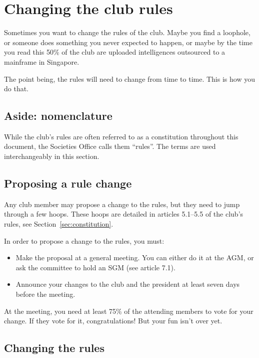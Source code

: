 \section{Changing the club rules}
\label{sec:rulechanges}

Sometimes you want to change the rules of the club. Maybe you find a loophole, or someone does something you never expected to happen, or maybe by the time you read this 50\% of the club are uploaded intelligences outsourced to a mainframe in Singapore.

The point being, the rules will need to change from time to time. This is how you do that.

\subsection{Aside: nomenclature}

While the club's rules are often referred to as a constitution throughout this document, the Societies Office calls them ``rules''. The terms are used interchangeably in this section.

\subsection{Proposing a rule change}

Any club member may propose a change to the rules, but they need to jump through a few hoops. These hoops are detailed in articles 5.1--5.5 of the club's rules, see Section~\ref{sec:constitution}.

In order to propose a change to the rules, you must:

\begin{itemize}
  \item Make the proposal at a general meeting. You can either do it at the AGM, or ask the committee to hold an SGM (see article 7.1).
  \item Announce your changes to the club and the president at least seven days before the meeting.
\end{itemize}

At the meeting, you need at least 75\% of the attending members to vote for your change. If they vote for it, congratulations! But your fun isn't over yet.

\subsection{Changing the rules}


